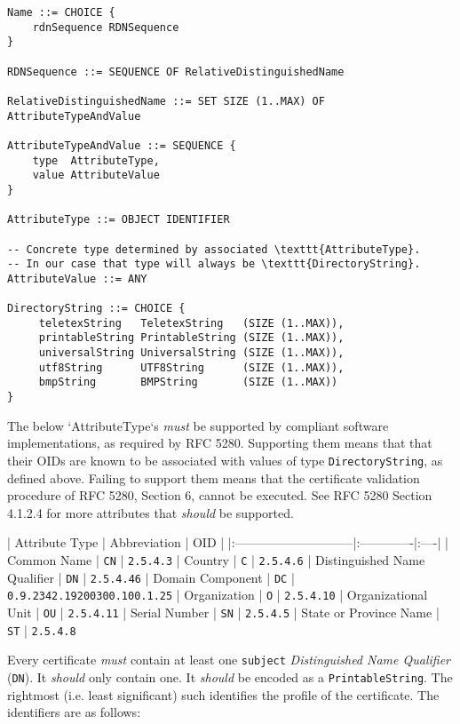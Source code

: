 \begin{verbatim}
Name ::= CHOICE {
    rdnSequence RDNSequence
}

RDNSequence ::= SEQUENCE OF RelativeDistinguishedName

RelativeDistinguishedName ::= SET SIZE (1..MAX) OF AttributeTypeAndValue

AttributeTypeAndValue ::= SEQUENCE {
    type  AttributeType,
    value AttributeValue
}

AttributeType ::= OBJECT IDENTIFIER

-- Concrete type determined by associated \texttt{AttributeType}.
-- In our case that type will always be \texttt{DirectoryString}.
AttributeValue ::= ANY

DirectoryString ::= CHOICE {
     teletexString   TeletexString   (SIZE (1..MAX)),
     printableString PrintableString (SIZE (1..MAX)),
     universalString UniversalString (SIZE (1..MAX)),
     utf8String      UTF8String      (SIZE (1..MAX)),
     bmpString       BMPString       (SIZE (1..MAX)) 
}
\end{verbatim}

The below `AttributeType`s \textit{must} be supported by compliant software implementations, as required by RFC 5280.
Supporting them means that that their OIDs are known to be associated with values of type \texttt{DirectoryString}, as defined above.
Failing to support them means that the certificate validation procedure of RFC 5280, Section 6, cannot be executed.
See RFC 5280 Section 4.1.2.4 for more attributes that \textit{should} be supported.

| Attribute Type               | Abbreviation | OID |
|:-----------------------------|:-------------|:----|
| Common Name                  | \texttt{CN}         | \texttt{2.5.4.3}
| Country                      | \texttt{C}          | \texttt{2.5.4.6} 
| Distinguished Name Qualifier | \texttt{DN}         | \texttt{2.5.4.46}
| Domain Component             | \texttt{DC}         | \texttt{0.9.2342.19200300.100.1.25}
| Organization                 | \texttt{O}          | \texttt{2.5.4.10}
| Organizational Unit          | \texttt{OU}         | \texttt{2.5.4.11}
| Serial Number                | \texttt{SN}         | \texttt{2.5.4.5}
| State or Province Name       | \texttt{ST}         | \texttt{2.5.4.8}

Every certificate \textit{must} contain at least one \texttt{subject} \textit{Distinguished Name Qualifier} (\texttt{DN}).
It \textit{should} only contain one.
It \textit{should} be encoded as a \texttt{PrintableString}.
The rightmost (i.e. least significant) such identifies the profile of the certificate.
The identifiers are as follows:

